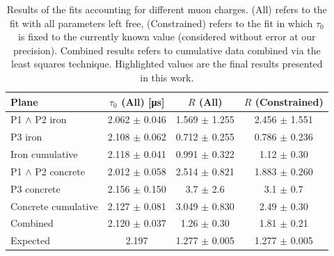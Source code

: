 \documentclass[../main.tex]{subfiles}
\begin{document}
\begin{table}[htb!]
        \caption{Results of the fits accounting for different muon charges. (All) refers to the fit with all parameters left free, (Constrained) refers to the fit in which $\tau_0$ is fixed to the currently known value (considered without error at our precision). Combined results refers to cumulative data combined via the least squares technique. Highlighted values are the final results presented in this work.}
    \label{tab:t0RFit}
        \centering
        \begin{tabular}{|l|cc|c|}
        \hline
        Plane             & $\tau_0$ (All) [\si{\micro \second}]         & $R$ (All)            & $R$ (Constrained) \\ \hline
        P1 $\land$ P2 iron     & 2.062 $\pm$ 0.046 & 1.569 $\pm$ 1.255     & 2.456 $\pm$ 1.551     \\
        P3 iron             & 2.108 $\pm$ 0.062 & 0.712 $\pm$ 0.255 & 0.786 $\pm$ 0.236   \\ 
        Iron cumulative & 2.118 $\pm$ 0.041 & 0.991 $\pm$ 0.322 & 1.12\phantom{0} $\pm$ 0.30\phantom{0} \\ \hline
        P1 $\land$ P2 concrete & 2.012 $\pm$ 0.058 & 2.514 $\pm$ 0.821   & 1.883 $\pm$ 0.260     \\
        P3 concrete         & 2.156 $\pm$ 0.150 & 3.7\phantom{00} $\pm$ 2.6\phantom{00}     & 3.1\phantom{00} $\pm$ 0.7\phantom{00}     \\ 
        Concrete cumulative & 2.127 $\pm$ 0.081 & 3.049 $\pm$ 0.830 & 2.49\phantom{0} $\pm$ 0.30\phantom{0} \\ \hline
        Combined            & \cellcolor[HTML]{67FD9A}2.120 $\pm$ 0.037 & \cellcolor[HTML]{67FD9A}1.26\phantom{0}  $\pm$ 0.30\phantom{0}   & 1.81\phantom{0}  $\pm$ 0.21\phantom{0}      \\
        Expected \cite{khachatryan2010measurement, Workman2022ynf}           & 2.197 \phantom{$\pm$ 0.000}        & 1.277 $\pm$ 0.005   & 1.277 $\pm$ 0.005     \\ \hline
        \end{tabular}
\end{table}
\end{document}

